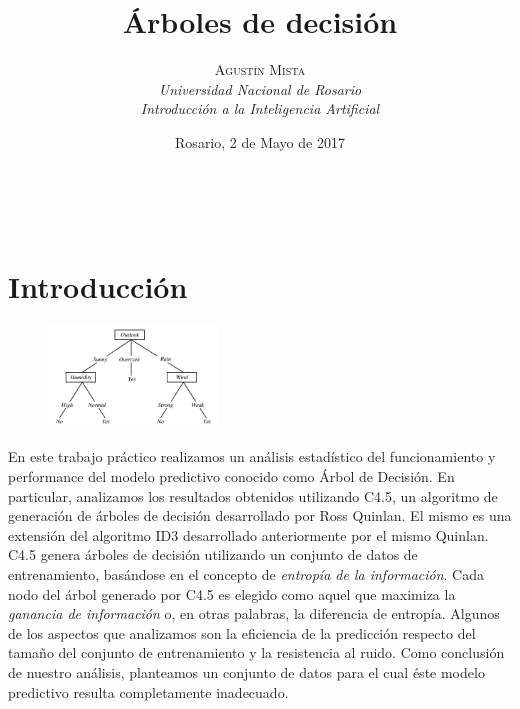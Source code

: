 \documentclass[a4paper, 11pt]{article} %
\title{\textbf{Árboles de decisión}}
\author{
	\textsc{Agustín Mista}\\
	\textit{Universidad Nacional de Rosario}\\
 	\textit{Introducción a la Inteligencia Artificial}
}
\date{Rosario, 2 de Mayo de 2017}
\makeatletter
\renewcommand{\maketitle}{ %
\begin{flushright} %
{\LARGE\@title} %

\vspace{50pt} %

{\large\@author} %
\\\@date %

\vspace{40pt} %
\end{flushright}
}
\makeatother
\begin{document}
\maketitle %




\vspace{20pt} %


\section*{Introducción}

\begin{figure}
	\begin{center}
		\vspace{-20pt}
		\includegraphics[width=0.4\textwidth]{play-tennis.jpg}
		\vspace{-20pt}
	\end{center}
\end{figure}

En este trabajo práctico realizamos un análisis estadístico del funcionamiento
y performance del modelo predictivo conocido como Árbol de Decisión. En
particular, analizamos los resultados obtenidos utilizando C4.5, un algoritmo
de generación de árboles de decisión desarrollado por Ross Quinlan. El mismo es
una extensión del algoritmo ID3 desarrollado anteriormente por el mismo
Quinlan. C4.5 genera árboles de decisión utilizando un conjunto de datos de
entrenamiento, basándose en el concepto de \textit{entropía de la información}.
Cada nodo del árbol generado por C4.5 es elegido como aquel que maximiza la
\textit{ganancia de información} o, en otras palabras, la diferencia de
entropía. Algunos de los aspectos que analizamos son la eficiencia de la
predicción respecto del tamaño del conjunto de entrenamiento y la resistencia
al ruido. Como conclusión de nuestro análisis, planteamos un conjunto de datos
para el cual éste modelo predictivo resulta completamente inadecuado.
\end{document}
